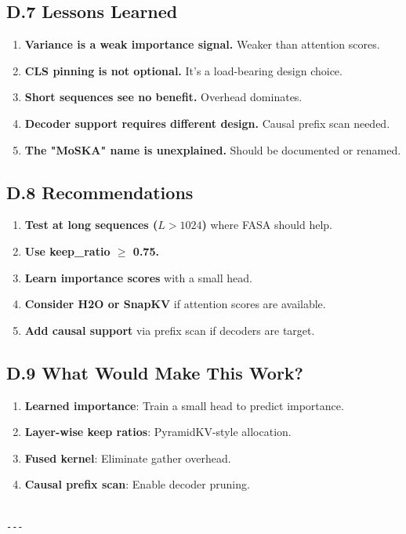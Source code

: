 \subsection{D.7 Lessons Learned}

\begin{enumerate}
\item \textbf{Variance is a weak importance signal.} Weaker than attention scores.
\item \textbf{CLS pinning is not optional.} It's a load-bearing design choice.
\item \textbf{Short sequences see no benefit.} Overhead dominates.
\item \textbf{Decoder support requires different design.} Causal prefix scan needed.
\item \textbf{The "MoSKA" name is unexplained.} Should be documented or renamed.

\end{enumerate}
\subsection{D.8 Recommendations}

\begin{enumerate}
\item \textbf{Test at long sequences ($L > 1024$)} where FASA should help.
\item \textbf{Use keep\_ratio $\ge$ 0.75.}
\item \textbf{Learn importance scores} with a small head.
\item \textbf{Consider H2O or SnapKV} if attention scores are available.
\item \textbf{Add causal support} via prefix scan if decoders are target.

\end{enumerate}
\subsection{D.9 What Would Make This Work?}

\begin{enumerate}
\item \textbf{Learned importance}: Train a small head to predict importance.
\item \textbf{Layer-wise keep ratios}: PyramidKV-style allocation.
\item \textbf{Fused kernel}: Eliminate gather overhead.
\item \textbf{Causal prefix scan}: Enable decoder pruning.
\end{enumerate}
\begin{lstlisting}

---
\end{lstlisting}


